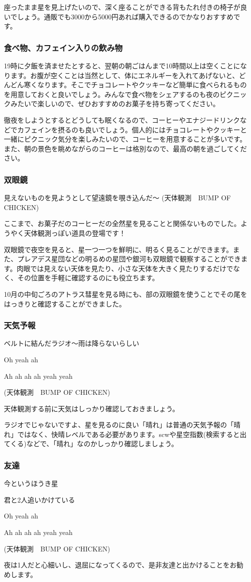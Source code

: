 \documentclass[../main]{subfiles}
\begin{document}
座ったまま星を見上げたいので、深く座ることができる背もたれ付きの椅子が良いでしょう。通販でも3000から5000円あれば購入できるのでかなりおすすめです。

\subsubsection{食べ物、カフェイン入りの飲み物}
19時に夕飯を済ませたとすると、翌朝の朝ごはんまで10時間以上は空くことになります。お腹が空くことは当然として、体にエネルギーを入れてあげないと、どんどん寒くなります。そこでチョコレートやクッキーなど簡単に食べられるものを用意しておくと良いでしょう。みんなで食べ物をシェアするのも夜のピクニックみたいで楽しいので、ぜひおすすめのお菓子を持ち寄ってください。

徹夜をしようとするとどうしても眠くなるので、コーヒーやエナジードリンクなどでカフェインを摂るのも良いでしょう。個人的にはチョコレートやクッキーと一緒にピクニック気分を楽しみたいので、コーヒーを用意することが多いです。また、朝の景色を眺めながらのコーヒーは格別なので、最高の朝を過ごしてください。

\subsubsection{双眼鏡}

見えないものを見ようとして望遠鏡を覗き込んだ〜 (天体観測　BUMP OF CHICKEN)

ここまで、お菓子だのコーヒーだの全然星を見ることと関係ないものでした。ようやく天体観測っぽい道具の登場です！

双眼鏡で夜空を見ると、星一つ一つを鮮明に、明るく見ることができます。また、プレアデス星団などの明るめの星団や銀河も双眼鏡で観察することができます。肉眼では見えない天体を見たり、小さな天体を大きく見たりするだけでなく、その位置を手軽に確認するのにも役立ちます。

10月の中旬ごろのアトラス彗星を見る時にも、部の双眼鏡を使うことでその尾をはっきりと確認することができました。

\subsubsection{天気予報}
ベルトに結んだラジオ〜雨は降らないらしい

Oh yeah ah

Ah ah ah ah yeah yeah


(天体観測　BUMP OF CHICKEN)

天体観測する前に天気はしっかり確認しておきましょう。

ラジオでじゃないですよ、星を見るのに良い「晴れ」は普通の天気予報の「晴れ」ではなく、快晴レベルである必要があります。scwや星空指数(検索すると出てくる)などで、「晴れ」なのかしっかり確認しましょう。


\subsubsection{友達}

今というほうき星

君と2人追いかけている

Oh yeah ah

Ah ah ah ah yeah yeah


(天体観測　BUMP OF CHICKEN)

夜は1人だと心細いし、退屈になってくるので、是非友達と出かけることをお勧めします。
\end{document}
